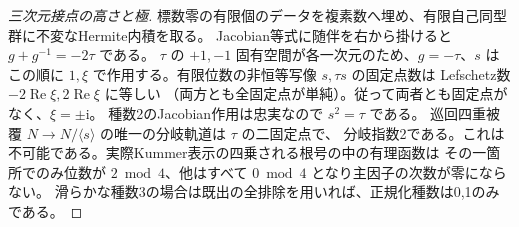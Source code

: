 \begin{proof}[三次元接点の高さと極]
標数零の有限個のデータを複素数へ埋め、有限自己同型群に不変なHermite内積を取る。
Jacobian等式に随伴を右から掛けると $g+g^{-1}=-2\tau$ である。
$\tau$ の $+1,-1$ 固有空間が各一次元のため、$g=-\tau$、$s$ は
この順に $1,\xi$ で作用する。有限位数の非恒等写像 $s,\tau s$ の固定点数は
Lefschetz数 $-2\operatorname{Re}\xi,2\operatorname{Re}\xi$ に等しい
（両方とも全固定点が単純）。従って両者とも固定点がなく、$\xi=\pm\mathrm i$。
種数2のJacobian作用は忠実なので $s^2=\tau$ である。
巡回四重被覆 $N\to N/\langle s\rangle$ の唯一の分岐軌道は $\tau$ の二固定点で、
分岐指数2である。これは不可能である。実際Kummer表示の四乗される根号の中の有理函数は
その一箇所でのみ位数が $2\bmod4$、他はすべて $0\bmod4$ となり主因子の次数が零にならない。
滑らかな種数3の場合は既出の全排除を用いれば、正規化種数は0,1のみである。
\end{proof}
